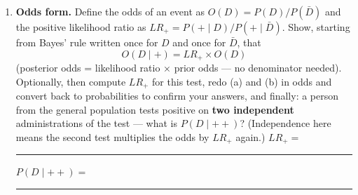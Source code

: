 \documentclass[
  11pt,
]{article}
\providecommand{\tightlist}{%
  \setlength{\itemsep}{0pt}\setlength{\parskip}{0pt}}
\newcommand{\answerspace}[1]{\par\vspace*{#1}}  %
\newcommand{\blank}[1][1.2in]{\rule{#1}{0.4pt}}
\begin{document}
\answerspace{2in}

\begin{enumerate}
\def\labelenumi{(\alph{enumi})}
\setcounter{enumi}{2}
\tightlist
\item
  \textbf{Odds form.} Define the odds of an event as
  \(O(D) = P(D)/P(\bar D)\) and the positive likelihood ratio as
  \(LR_+ = P(+\mid D)/P(+\mid \bar D)\). Show, starting from Bayes' rule
  written once for \(D\) and once for \(\bar D\), that
  \[O(D\mid +) = LR_+ \times O(D)\] (posterior odds = likelihood ratio ×
  prior odds --- no denominator needed). Optionally, then compute
  \(LR_+\) for this test, redo (a) and (b) in odds and convert back to
  probabilities to confirm your answers, and finally: a person from the
  general population tests positive on \textbf{two independent}
  administrations of the test --- what is \(P(D\mid ++)\)? (Independence
  here means the second test multiplies the odds by \(LR_+\) again.)
  \(LR_+ =\) \blank[0.6in]\quad \(P(D\mid ++) =\) \blank[0.8in]
\end{enumerate}

\answerspace{4in}
\end{document}

